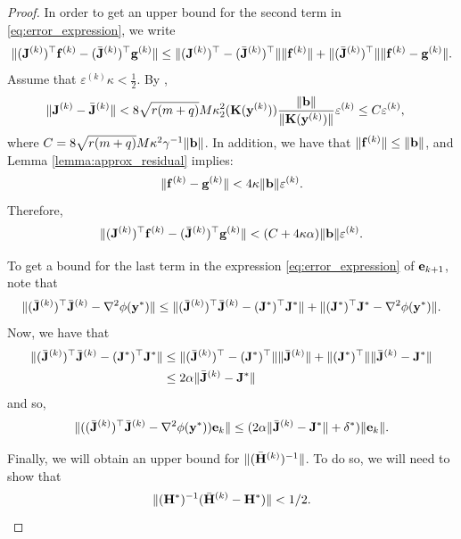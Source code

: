 \documentclass[onefignum,onetabnum]{siamart171218}
\newcommand{\bH}{{\bf H}}
\newcommand{\bJ}{{\bf J}}
\newcommand{\bK}{{\bf K}}
\newcommand{\bb}{{\bf b}}
\newcommand{\be}{{\bf e}}
\newcommand{\bff}{{\bf f}}
\newcommand{\bg}{{\bf g}}
\newcommand{\by}{{\bf y}}
\begin{document}
\begin{proof}
In order to get an upper  bound for the second term in \eqref{eq:error_expression}, we write
\begin{align*}
\| (\bJ^{(k)})^\top \bff^{(k)} - (\bar\bJ^{(k)})^\top \bg^{(k)}\|\le\| (\bJ^{(k)})^\top  - (\bar\bJ^{(k)})^\top  \| \|\bff^{(k)}\|+  \|(\bar\bJ^{(k)})^\top \| \|\bff^{(k)}- \bg^{(k)}\|.
\end{align*}
Assume that $\varepsilon^{(k)} \kappa <\frac{1}{2}$. By \cite[Lemma 3.2]{espanol2025local}, 
\begin{align}\label{eq: approx_Jacobian}
\|\bJ^{(k)}  - \bar\bJ^{(k)}\| &<  8\sqrt{r(m+q)} M  \kappa_2^2(\bK(\by^{(k)})) \frac{\|\bb\|}{\|\bK(\by^{(k)})\|} \varepsilon^{(k)}
\le C  \varepsilon^{(k)},
\end{align}
where $C=8\sqrt{r(m+q)} M  \kappa^2 \gamma^{-1} \| \bb\|$. 
In addition, we have that 
$\|\bff^{(k)}\| \le \| \bb\|$, and Lemma \ref{lemma:approx_residual} implies:
 $$\| \bff^{(k)}- \bg^{(k)} \| <  4\kappa \|\bb\| \varepsilon^{(k)}. $$
Therefore, 
\begin{equation}\label{eq:gradient}
\|(\bJ^{(k)})^\top \bff^{(k)} - (\bar\bJ^{(k)})^\top \bg^{(k)}\|<  (C + 4\kappa \alpha )\| \bb\| \varepsilon^{(k)}.
\end{equation}

To get a bound for the last term in the expression \eqref{eq:error_expression} of $\be_{k+1}$, note that
$$\| (\bar\bJ^{(k)})^\top \bar\bJ^{(k)} - \nabla^2\phi (\by^\ast) \| \le \|(\bar\bJ^{(k)})^\top \bar\bJ^{(k)} - (\bJ^\ast)^\top \bJ^\ast\| +\|  (\bJ^\ast)^\top \bJ^\ast- \nabla^2 \phi (\by^\ast) \|.$$
Now, we have that
\begin{align*}
\|(\bar\bJ^{(k)})^\top \bar\bJ^{(k)} - (\bJ^\ast)^\top \bJ^\ast\|  &\le 
\|(\bar\bJ^{(k)})^\top - (\bJ^\ast)^\top \| \|\bar\bJ^{(k)} \|+ \|(\bJ^\ast)^\top \| \|\bar\bJ^{(k)} - \bJ^\ast \| \\ &\le 2\alpha \|\bar\bJ^{(k)} - \bJ^\ast \|
\end{align*}
and so,
\begin{equation}\label{eq:hessian}
\| ((\bar\bJ^{(k)})^\top \bar\bJ^{(k)} - \nabla^2 \phi (\by^\ast) ) \be_{k}\| \le (2\alpha \|\bar\bJ^{(k)} - \bJ^\ast \| +\delta^\ast) \|\be_{k}\|.
\end{equation}

Finally, we will obtain an upper bound for $\|(\bar\bH^{(k)})^{-1}\|$. To do so, we will need to show that
\[\|(\bH^\ast)^{-1} (\bar\bH^{(k)}-\bH^\ast)\|<1/2.\]


\end{proof}
\end{document}
